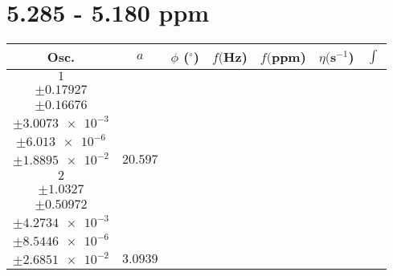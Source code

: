 \documentclass[8pt]{article}
\begin{document}
\section*{5.285 - 5.180 ppm}
\begin{longtable}[l]{c c c c c c c}
\toprule
Osc. & $a$ & $\phi$ ($^{\circ}$) & $f ($Hz) & $f ($ppm) & $\eta ($s$^{-1}$) & $\int$\\
\midrule
$\num{1}$ & \begin{tabular}[c]{@{}c@{}}$\num{61.593}$ \\ $\pm\num{0.17927}$\end{tabular} & \begin{tabular}[c]{@{}c@{}}$\num{0.91898}$ \\ $\pm\num{0.16676}$\end{tabular} & \begin{tabular}[c]{@{}c@{}}$\num{2.6018e+3}$ \\ $\pm\num{3.0073e-3}$\end{tabular} & \begin{tabular}[c]{@{}c@{}}$\num{5.2023}$ \\ $\pm\num{6.013e-6}$\end{tabular} & \begin{tabular}[c]{@{}c@{}}$\num{7.3211}$ \\ $\pm\num{1.8895e-2}$\end{tabular} & $\num{20.597}$\\
$\num{2}$ & \begin{tabular}[c]{@{}c@{}}$\num{10.531}$ \\ $\pm\num{1.0327}$\end{tabular} & \begin{tabular}[c]{@{}c@{}}$\num{9.7485e-2}$ \\ $\pm\num{0.50972}$\end{tabular} & \begin{tabular}[c]{@{}c@{}}$\num{2.6084e+3}$ \\ $\pm\num{4.2734e-3}$\end{tabular} & \begin{tabular}[c]{@{}c@{}}$\num{5.2153}$ \\ $\pm\num{8.5446e-6}$\end{tabular} & \begin{tabular}[c]{@{}c@{}}$\num{21.271}$ \\ $\pm\num{2.6851e-2}$\end{tabular} & $\num{3.0939}$\\

\end{longtable}
\end{document}

